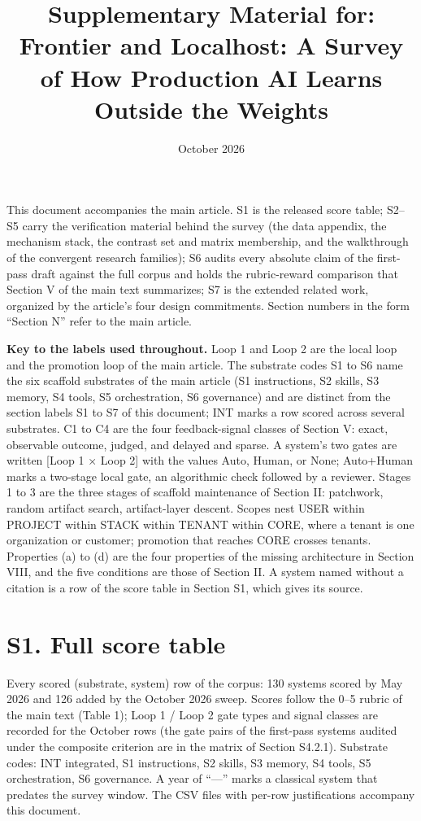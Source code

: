 \documentclass[
]{article}
\title{Supplementary Material for: Frontier and Localhost: A Survey of
How Production AI Learns Outside the Weights}
\author{}
\date{October 2026}
\begin{document}
\maketitle

This document accompanies the main article. S1 is the released score
table; S2--S5 carry the verification material behind the survey (the
data appendix, the mechanism stack, the contrast set and matrix
membership, and the walkthrough of the convergent research families); S6
audits every absolute claim of the first-pass draft against the full
corpus and holds the rubric-reward comparison that Section V of the main
text summarizes; S7 is the extended related work, organized by the
article's four design commitments. Section numbers in the form ``Section
N'' refer to the main article.

\textbf{Key to the labels used throughout.} Loop 1 and Loop 2 are the
local loop and the promotion loop of the main article. The substrate
codes S1 to S6 name the six scaffold substrates of the main article (S1
instructions, S2 skills, S3 memory, S4 tools, S5 orchestration, S6
governance) and are distinct from the section labels S1 to S7 of this
document; INT marks a row scored across several substrates. C1 to C4 are
the four feedback-signal classes of Section V: exact, observable
outcome, judged, and delayed and sparse. A system's two gates are
written {[}Loop 1 × Loop 2{]} with the values Auto, Human, or None;
Auto+Human marks a two-stage local gate, an algorithmic check followed
by a reviewer. Stages 1 to 3 are the three stages of scaffold
maintenance of Section II: patchwork, random artifact search,
artifact-layer descent. Scopes nest USER within PROJECT within STACK
within TENANT within CORE, where a tenant is one organization or
customer; promotion that reaches CORE crosses tenants. Properties (a) to
(d) are the four properties of the missing architecture in Section VIII,
and the five conditions are those of Section II. A system named without
a citation is a row of the score table in Section S1, which gives its
source.

\section{S1. Full score table}\label{s1.-full-score-table}

Every scored (substrate, system) row of the corpus: 130 systems scored
by May 2026 and 126 added by the October 2026 sweep. Scores follow the
0--5 rubric of the main text (Table 1); Loop 1 / Loop 2 gate types and
signal classes are recorded for the October rows (the gate pairs of the
first-pass systems audited under the composite criterion are in the
matrix of Section S4.2.1). Substrate codes: INT integrated, S1
instructions, S2 skills, S3 memory, S4 tools, S5 orchestration, S6
governance. A year of ``---'' marks a classical system that predates the
survey window. The CSV files with per-row justifications accompany this
document.
\end{document}
